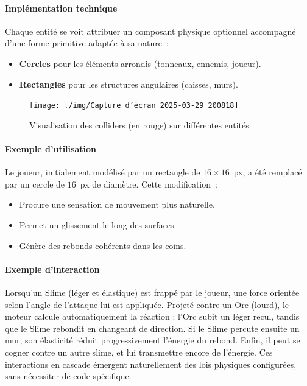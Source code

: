 \documentclass[a4paper,11pt]{article}
\begin{document}
\paragraph{Implémentation technique} 
Chaque entité se voit attribuer un composant physique optionnel accompagné d'une forme primitive adaptée à sa nature~:
\begin{itemize}
    \item \textbf{Cercles} pour les éléments arrondis (tonneaux, ennemis, joueur).
    \item \textbf{Rectangles} pour les structures angulaires (caisses, murs).
\end{itemize}
\begin{figure}[ht]
    \centering
    \texttt{[image: ./img/Capture d'écran 2025-03-29 200818]}
    \caption{Visualisation des colliders (en rouge) sur différentes entités}
    \label{fig:colliders_exemple}
\end{figure}

\paragraph{Exemple d'utilisation} 
Le joueur, initialement modélisé par un rectangle de \(16 \times 16\)~px, a été remplacé par un cercle de \(16\)~px de diamètre. Cette modification~:
\begin{itemize}
    \item Procure une sensation de mouvement plus naturelle.
    \item Permet un glissement le long des surfaces.
    \item Génère des rebonds cohérents dans les coins.
\end{itemize}

\paragraph{Exemple d'interaction}  
Lorsqu’un Slime (léger et élastique) est frappé par le joueur, une force orientée selon l’angle de l’attaque lui est appliquée. Projeté contre un Orc (lourd), le moteur calcule automatiquement la réaction : l’Orc subit un léger recul, tandis que le Slime rebondit en changeant de direction. Si le Slime percute ensuite un mur, son élasticité réduit progressivement l’énergie du rebond. Enfin, il peut se cogner contre un autre slime, et lui transmettre encore de l’énergie. Ces interactions en cascade émergent naturellement des lois physiques configurées, sans nécessiter de code spécifique.
\end{document}
